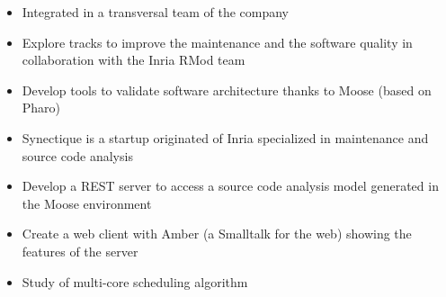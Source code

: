 \documentclass[10pt,a4paper]{altacv}
\begin{document}
\divider

\begin{itemize}
	\item Integrated in a transversal team of the company
	\item Explore tracks to improve the maintenance and the software quality in collaboration with the Inria RMod team
	\item Develop tools to validate software architecture thanks to Moose (based on Pharo)
\end{itemize}

\divider

\begin{itemize}
	\item Synectique is a startup originated of Inria specialized in maintenance and source code analysis \item Develop a REST server to access a source code analysis model generated in the Moose environment
	\item Create a web client with Amber (a Smalltalk for the web) showing the features of the server
\end{itemize}

\divider

\begin{itemize}
	\item Study of multi-core scheduling algorithm
\end{itemize}


%


\end{document}
